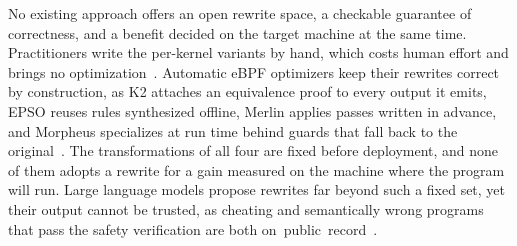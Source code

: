 No existing approach offers an open rewrite space, a checkable guarantee of correctness, and a benefit decided on the target machine at the same time.
Practitioners write the per-kernel variants by hand, which costs human effort and brings no optimization~\cite{mao2024merlin}.
Automatic eBPF optimizers keep their rewrites correct by construction, as K2 attaches an equivalence proof to every output it emits, EPSO reuses rules synthesized offline, Merlin applies passes written in advance, and Morpheus specializes at run time behind guards that fall back to the original~\cite{xu2021synthesizing,zhu2025epso,mao2024merlin,miano2022morpheus}.
The transformations of all four are fixed before deployment, and none of them adopts a rewrite for a gain measured on the machine where the program will run.
Large language models propose rewrites far beyond such a fixed set, yet their output cannot be trusted, as cheating and semantically wrong programs that pass the safety verification are both \mbox{on public record~\cite{metr2025details,sakana2025ai,zheng2024kgent}}.

